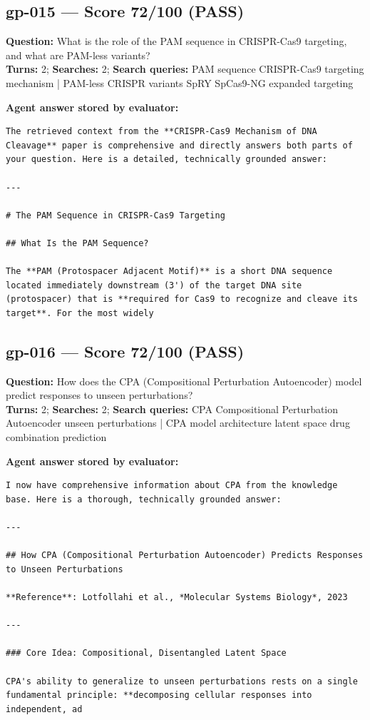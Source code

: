 \documentclass[12pt, a4paper]{article}
\begin{document}
\subsection*{gp-015 --- Score 72/100 (PASS)}
\noindent\textbf{Question:} What is the role of the PAM sequence in CRISPR-Cas9 targeting, and what are PAM-less variants?\\
\textbf{Turns:} 2; \textbf{Searches:} 2; \textbf{Search queries:} PAM sequence CRISPR-Cas9 targeting mechanism | PAM-less CRISPR variants SpRY SpCas9-NG expanded targeting

\noindent\textbf{Agent answer stored by evaluator:}
\begin{lstlisting}[numbers=none]
The retrieved context from the **CRISPR-Cas9 Mechanism of DNA Cleavage** paper is comprehensive and directly answers both parts of your question. Here is a detailed, technically grounded answer:

---

# The PAM Sequence in CRISPR-Cas9 Targeting

## What Is the PAM Sequence?

The **PAM (Protospacer Adjacent Motif)** is a short DNA sequence located immediately downstream (3') of the target DNA site (protospacer) that is **required for Cas9 to recognize and cleave its target**. For the most widely 
\end{lstlisting}

\subsection*{gp-016 --- Score 72/100 (PASS)}
\noindent\textbf{Question:} How does the CPA (Compositional Perturbation Autoencoder) model predict responses to unseen perturbations?\\
\textbf{Turns:} 2; \textbf{Searches:} 2; \textbf{Search queries:} CPA Compositional Perturbation Autoencoder unseen perturbations | CPA model architecture latent space drug combination prediction

\noindent\textbf{Agent answer stored by evaluator:}
\begin{lstlisting}[numbers=none]
I now have comprehensive information about CPA from the knowledge base. Here is a thorough, technically grounded answer:

---

## How CPA (Compositional Perturbation Autoencoder) Predicts Responses to Unseen Perturbations

**Reference**: Lotfollahi et al., *Molecular Systems Biology*, 2023

---

### Core Idea: Compositional, Disentangled Latent Space

CPA's ability to generalize to unseen perturbations rests on a single fundamental principle: **decomposing cellular responses into independent, ad
\end{lstlisting}
\end{document}
